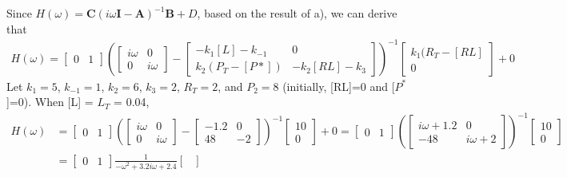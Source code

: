 \documentclass[paper=a4, fontsize=11pt]{scrartcl} %
\numberwithin{equation}{section} %
\numberwithin{figure}{section} %
\numberwithin{table}{section} %
\begin{document}
\begin{enumerate}[a)]
		Since $H(\omega)= \mathbf{C}(i\omega\mathbf{I-A})^{-1}\mathbf{B}+D$, based on the result of a), we can derive that
		\begin{align*}
			H(\omega)= 
			\begin{bmatrix}
				0 & 1
			\end{bmatrix}
			(
			\begin{bmatrix}
				i\omega & 0\\
				0 & i\omega
			\end{bmatrix}
			-
			\begin{bmatrix}
				-k_1[L]-k_{-1} & 0\\
				k_2(P_T-[P*]) & -k_2[RL]-k_3
			\end{bmatrix})^{-1}
			\begin{bmatrix}
				k_1(R_T-[RL] \\0
			\end{bmatrix}
			+ 0
		\end{align*}
		Let $k_1=5$, $k_{-1}=1$, $k_2=6$, $k_3=2$, $R_T=2$, and $P_2=8$ (initially, [RL]=0 and [$P^*$]=0). When [L] = $L_T$ = 0.04,
		\begin{align*}
			H(\omega)&= 
			\begin{bmatrix}
				0 & 1
			\end{bmatrix}
			(
			\begin{bmatrix}
				i\omega & 0\\
				0 & i\omega
			\end{bmatrix}
			-
			\begin{bmatrix}
				-1.2 & 0\\
				48 & -2
			\end{bmatrix})^{-1}
			\begin{bmatrix}
				10 \\0
			\end{bmatrix}
			+ 0
			=
			\begin{bmatrix}
				0 & 1
			\end{bmatrix}
			(
			\begin{bmatrix}
				i\omega+1.2 & 0\\
				-48 & i\omega+2
			\end{bmatrix}
			)^{-1}
			\begin{bmatrix}
				10 \\0
			\end{bmatrix}
			\\&=
			\begin{bmatrix}
				0 & 1
			\end{bmatrix}
			\frac{1}{-\omega^2+3.2i\omega+2.4}
			\begin{bmatrix}

\end{bmatrix}
\end{align*}
\end{enumerate}
\end{document}
